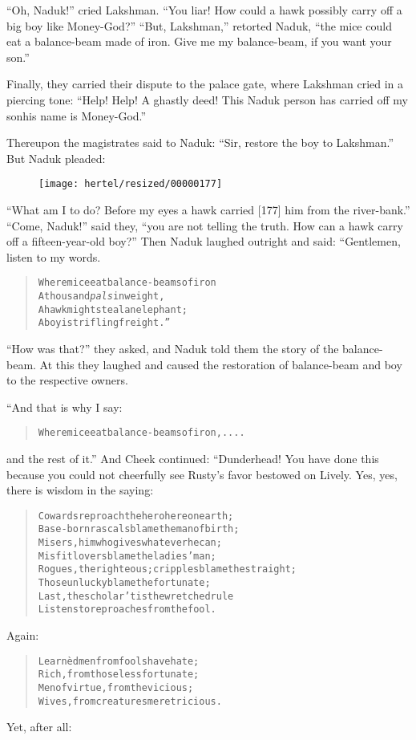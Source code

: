 \documentclass[article, twoside, 10pt]{memoir}
\renewenvironment{verbatim}{%
\begin{quote}%
\vskip -10pt%
\begin{alltt}\normalfont\small}{\end{alltt}%
\end{quote}%
\vskip -10pt
} %
\begin{document}
``Oh, Naduk!'' cried Lakshman.
``You liar! How could a hawk possibly carry off a big boy like Money-God?''
``But, Lakshman,'' retorted Naduk,
``the mice could eat a balance-beam made of iron. Give me my balance-beam, if you want your son.''

Finally, they carried their dispute to the palace gate, where
Lakshman cried in a piercing tone:
``Help! Help! A ghastly deed! This Naduk person has carried off my son{\textemdash}his name is Money-God.''

Thereupon the magistrates said to Naduk:
``Sir, restore the boy to Lakshman.'' But Naduk pleaded:
\begin{figure}[p]\texttt{[image: hertel/resized/00000177]}\end{figure}``What am I to do? Before my eyes a hawk carried [177] him from the river-bank.''
``Come, Naduk!'' said they,
``you are not telling the truth. How can a hawk carry off a fifteen-year-old boy?''
Then Naduk laughed outright and said: “Gentlemen, listen to my
words.

\begin{verbatim}
Where mice eat balance-beams of iron
    A thousand \emph{pals} in weight,
A hawk might steal an elephant;
    A boy is trifling freight.”
\end{verbatim}
``How was that?'' they asked, and Naduk told them the story of the
balance-beam. At this they laughed and caused the restoration of
balance-beam and boy to the respective owners.

“And that is why I say:

\begin{verbatim}
Where mice eat balance-beams of iron, ....
\end{verbatim}
and the rest of it.” And Cheek continued: “Dunderhead! You have
done this because you could not cheerfully see Rusty's favor
bestowed on Lively. Yes, yes, there is wisdom in the saying:

\begin{verbatim}
Cowards reproach the hero here on earth;
Base-born rascals blame the man of birth;
Misers, him who gives whatever he can;
Misfit lovers blame the ladies' man;
Rogues, the righteous; cripples blame the straight;
Those unlucky blame the fortunate;
Last, the scholar{\textemdash}'tis the wretched rule{\textemdash}
Listens to reproaches from the fool.
\end{verbatim}
Again:

\begin{verbatim}
Learnèd men from fools have hate;
Rich, from those less fortunate;
Men of virtue, from the vicious;
Wives, from creatures meretricious.
\end{verbatim}
Yet, after all:
\end{document}
